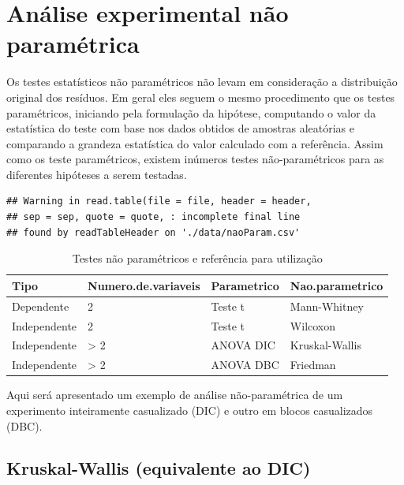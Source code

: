 \documentclass[
]{article}
\begin{document}
\hypertarget{anuxe1lise-experimental-nuxe3o-paramuxe9trica}{%
\section{Análise experimental não paramétrica}\label{anuxe1lise-experimental-nuxe3o-paramuxe9trica}}

Os testes estatísticos não paramétricos não levam em consideração a distribuição original dos resíduos. Em geral eles seguem o mesmo procedimento que os testes paramétricos, iniciando pela formulação da hipótese, computando o valor da estatística do teste com base nos dados obtidos de amostras aleatórias e comparando a grandeza estatística do valor calculado com a referência. Assim como os teste paramétricos, existem inúmeros testes não-paramétricos para as diferentes hipóteses a serem testadas.

\begin{verbatim}
## Warning in read.table(file = file, header = header,
## sep = sep, quote = quote, : incomplete final line
## found by readTableHeader on './data/naoParam.csv'
\end{verbatim}

\begin{table}

\caption{\label{tab:unnamed-chunk-173}Testes não paramétricos e referência para utilização}
\centering
\begin{tabular}[t]{l|l|l|l}
\hline
Tipo & Numero.de.variaveis & Parametrico & Nao.parametrico\\
\hline
Dependente & 2 & Teste t & Mann-Whitney\\
\hline
Independente & 2 & Teste t & Wilcoxon\\
\hline
Independente & > 2 & ANOVA DIC & Kruskal-Wallis\\
\hline
Independente & > 2 & ANOVA DBC & Friedman\\
\hline
\end{tabular}
\end{table}

Aqui será apresentado um exemplo de análise não-paramétrica de um experimento inteiramente casualizado (DIC) e outro em blocos casualizados (DBC).

\hypertarget{kruskal-wallis-equivalente-ao-dic}{%
\subsection{Kruskal-Wallis (equivalente ao DIC)}\label{kruskal-wallis-equivalente-ao-dic}}
\end{document}
